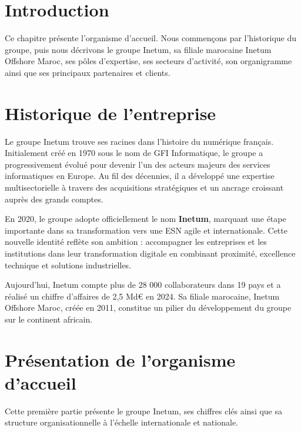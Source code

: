 \section*{Introduction}
Ce chapitre présente l'organisme d'accueil. Nous commençons par l'historique du groupe, puis nous décrivons le groupe Inetum, sa filiale marocaine Inetum Offshore Maroc, ses pôles d'expertise, ses secteurs d'activité, son organigramme ainsi que ses principaux partenaires et clients.

\section{Historique de l'entreprise}
Le groupe Inetum trouve ses racines dans l'histoire du numérique français. Initialement créé en 1970 sous le nom de GFI Informatique, le groupe a progressivement évolué pour devenir l'un des acteurs majeurs des services informatiques en Europe. Au fil des décennies, il a développé une expertise multisectorielle à travers des acquisitions stratégiques et un ancrage croissant auprès des grands comptes.

En 2020, le groupe adopte officiellement le nom \textbf{Inetum}, marquant une étape importante dans sa transformation vers une ESN agile et internationale. Cette nouvelle identité reflète son ambition : accompagner les entreprises et les institutions dans leur transformation digitale en combinant proximité, excellence technique et solutions industrielles.

Aujourd'hui, Inetum compte plus de 28 000 collaborateurs dans 19 pays et a réalisé un chiffre d'affaires de 2,5 Md€ en 2024. Sa filiale marocaine, Inetum Offshore Maroc, créée en 2011, constitue un pilier du développement du groupe sur le continent africain.

\section{Présentation de l'organisme d'accueil}
Cette première partie présente le groupe Inetum, ses chiffres clés ainsi que sa structure organisationnelle à l'échelle internationale et nationale.

